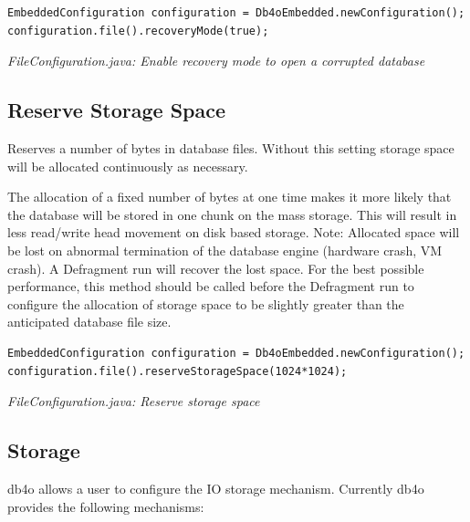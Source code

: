 \begin{lstlisting}
EmbeddedConfiguration configuration = Db4oEmbedded.newConfiguration();
configuration.file().recoveryMode(true);
\end{lstlisting}

{\small\itshape FileConfiguration.java: Enable recovery mode to open a corrupted database\par}
\medskip

\subsection{Reserve Storage Space}
\label{ref:configuration-file-reserve-storage-space}

Reserves a number of bytes in database files. Without this setting storage space will be allocated continuously as necessary.

The allocation of a fixed number of bytes at one time makes it more likely that the database will be stored in one chunk on the mass storage. This will result in less read/write head movement on disk based storage. Note: Allocated space will be lost on abnormal termination of the database engine (hardware crash, VM crash). A Defragment run will recover the lost space. For the best possible performance, this method should be called before the Defragment run to configure the allocation of storage space to be slightly greater than the anticipated database file size.

\begin{lstlisting}
EmbeddedConfiguration configuration = Db4oEmbedded.newConfiguration();
configuration.file().reserveStorageSpace(1024*1024);
\end{lstlisting}

{\small\itshape FileConfiguration.java: Reserve storage space\par}
\medskip

\subsection{Storage}
\label{ref:configuration-file-storage}

db4o allows a user to configure the IO storage mechanism. Currently db4o provides the following mechanisms:

